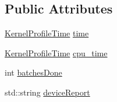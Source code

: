 \subsection*{Public Attributes}
\begin{DoxyCompactItemize}
\item 
\hyperlink{struct_queued_c_u_d_a_tracker_1_1_kernel_profile_time}{Kernel\+Profile\+Time} \hyperlink{class_queued_c_u_d_a_tracker_a6557b929cd8bd14618787c6a90671cc0}{time}
\item 
\hyperlink{struct_queued_c_u_d_a_tracker_1_1_kernel_profile_time}{Kernel\+Profile\+Time} \hyperlink{class_queued_c_u_d_a_tracker_ae8b2eeef65a2a1acde697df6c206ae08}{cpu\+\_\+time}
\item 
int \hyperlink{class_queued_c_u_d_a_tracker_a6c9bf05a64537e9a978d9e7a71bb20fb}{batches\+Done}
\item 
std\+::string \hyperlink{class_queued_c_u_d_a_tracker_af28a9fc89bcd9634e81b3fc404809aaf}{device\+Report}
\end{DoxyCompactItemize}
